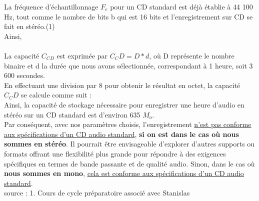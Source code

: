 La fréquence d'échantillonnage $F_e$ pour un CD standard est déjà établie à 44 100 Hz, tout comme le nombre de bits b qui est 16 bits et l'enregistrement sur CD se fait en stéréo.(1)
\\
Ainsi, \\
\\
La capacité $C_{CD}$ est exprimée par $C_CD = D * d$, où D représente le nombre binaire et d la durée que nous avons sélectionnée, correspondant à 1 heure, soit 3 600 secondes.
\\
En effectuant une division par 8 pour obtenir le résultat en octet, la capacité $C_CD$ se calcule comme suit : 
\\
Ainsi, la capacité de stockage nécessaire pour enregistrer une heure d'audio en stéréo sur un CD standard est d'environ 635 $M_o$.
\\

Par conséquent, avec nos paramètres choisis, l'enregistrement \uline{n'est pas conforme aux spécifications d'un CD audio standard}, \textbf{si on est dans le cas où nous sommes en stéréo}. Il pourrait être envisageable d'explorer d'autres supports ou formats offrant une flexibilité plus grande pour répondre à des exigences spécifiques en termes de bande passante et de qualité audio. Sinon, dans le cas où \textbf{nous sommes en mono}, \uline{cela est conforme aux spécifications d'un CD audio standard}.
\\
\scriptsize{source :}
1. Cours de cycle préparatoire associé avec Stanislas
\normalsize
